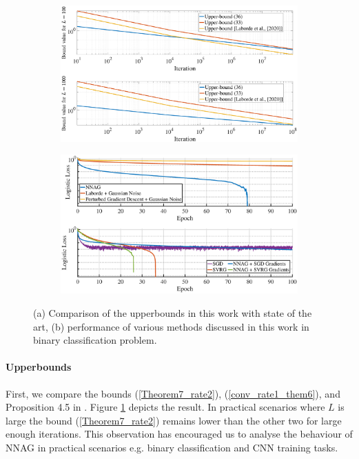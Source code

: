 \documentclass{article}
\theoremstyle{plain}
\theoremstyle{definition}
\theoremstyle{remark}
\begin{document}
\begin{figure}
  \begin{subfigure}{0.51\textwidth}
    \includegraphics[width=\linewidth]{NIPS 2023/Data/upperbounds.eps}
    \caption{} \label{fig1}
  \end{subfigure}%
  \hspace*{\fill}   %
  \begin{subfigure}{0.51\textwidth}
    \includegraphics[width=\linewidth]{NIPS 2023/Data/binary_me_sgd_svrg_corrected_me_sgd_2e5_gaussian_noise_and_no_noise_100_epochs.eps}
    \caption{} \label{fig2}
  \end{subfigure}%
\caption{(a) Comparison of the upperbounds in this work with state of the art, (b) performance of various methods discussed in this work in binary classification problem.} \label{fig:1}
\end{figure}
\paragraph{Upperbounds}
First, we compare the bounds (\ref{Theorem7_rate2}), (\ref{conv_rate1_them6}), and Proposition 4.5 in \citep{pmlr-v108-laborde20a}. Figure \ref{fig1} depicts the result. In practical scenarios where \(L\) is large \citep{shi2022efficiently} the bound (\ref{Theorem7_rate2}) remains lower than the other two for large enough iterations. This observation has encouraged us to analyse the behaviour of NNAG in practical scenarios e.g. binary classification and CNN training tasks.
\end{document}

